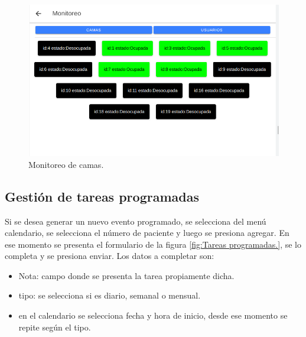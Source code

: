 \begin{figure}[ht]
	\centering
	\includegraphics[scale=.55]{./Figures/monitoreo-camas.png}
	\caption{Monitoreo de camas.}
	\label{fig:Monitoreo de camas.}
\end{figure} 

\subsection{Gestión de tareas programadas}

Si se desea generar un nuevo evento programado, se selecciona del menú  calendario, se selecciona el número de paciente y luego se presiona agregar. En ese momento se presenta el formulario de la figura \ref{fig:Tareas programadas.}, se lo completa y se presiona enviar. Los datos a completar son:
\begin{itemize}
\item Nota: campo donde se presenta la tarea propiamente dicha.
\item tipo: se selecciona si es diario, semanal o mensual.
\item en el calendario se selecciona fecha y hora de inicio, desde ese momento se repite según el tipo.
\end{itemize}

